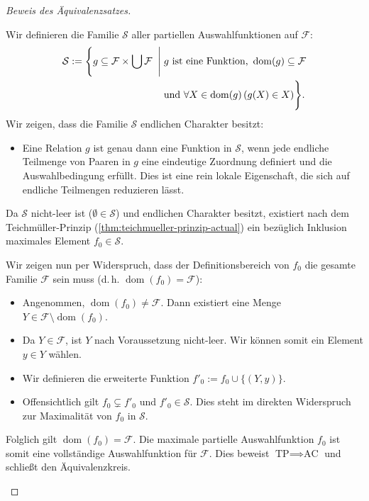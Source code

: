 \begin{proof}[Beweis des Äquivalenzsatzes]
\begin{math-stroke}
\begin{short-proof}
Wir definieren die Familie $\mathcal{S}$ aller partiellen Auswahlfunktionen auf $\mathcal{F}$:
\begin{equation}\label{eq:partielle-auswahlfunktionen-actual}
\begin{split}
\mathcal{S} := \Biggl\{ g \subseteq \mathcal{F} \times \bigcup \mathcal{F} \;\Biggm|\; & g \text{ ist eine Funktion, } \operatorname{dom}(g) \subseteq \mathcal{F} \\
& \text{und } \forall X \in \operatorname{dom}(g) \, (g(X) \in X) \Biggr\}.
\end{split}
\end{equation}
Wir zeigen, dass die Familie $\mathcal{S}$ endlichen Charakter besitzt:
\begin{itemize}
    \item Eine Relation $g$ ist genau dann eine Funktion in $\mathcal{S}$, wenn jede endliche Teilmenge von Paaren in $g$ eine eindeutige Zuordnung definiert und die Auswahlbedingung erfüllt. Dies ist eine rein lokale Eigenschaft, die sich auf endliche Teilmengen reduzieren lässt. 
\end{itemize}
Da $\mathcal{S}$ nicht-leer ist ($\emptyset \in \mathcal{S}$) und endlichen Charakter besitzt, existiert nach dem Teichmüller-Prinzip (\cref{thm:teichmueller-prinzip-actual}) ein bezüglich Inklusion maximales Element $f_0 \in \mathcal{S}$.

Wir zeigen nun per Widerspruch, dass der Definitionsbereich von $f_0$ die gesamte Familie $\mathcal{F}$ sein muss (d.\,h. $\operatorname{dom}(f_0) = \mathcal{F}$):
\begin{itemize}
    \item Angenommen, $\operatorname{dom}(f_0) \neq \mathcal{F}$. Dann existiert eine Menge $Y \in \mathcal{F} \setminus \operatorname{dom}(f_0)$.
    \item Da $Y \in \mathcal{F}$, ist $Y$ nach Voraussetzung nicht-leer. Wir können somit ein Element $y \in Y$ wählen.
    \item Wir definieren die erweiterte Funktion $f'_0 := f_0 \cup \{(Y, y)\}$.
    \item Offensichtlich gilt $f_0 \subsetneq f'_0$ und $f'_0 \in \mathcal{S}$. Dies steht im direkten Widerspruch zur Maximalität von $f_0$ in $\mathcal{S}$.
\end{itemize}
Folglich gilt $\operatorname{dom}(f_0) = \mathcal{F}$. Die maximale partielle Auswahlfunktion $f_0$ ist somit eine vollständige Auswahlfunktion für $\mathcal{F}$. Dies beweist $\text{TP} \implies \text{AC}$ und schließt den Äquivalenzkreis.
\end{short-proof}
\end{math-stroke}


\end{proof}
